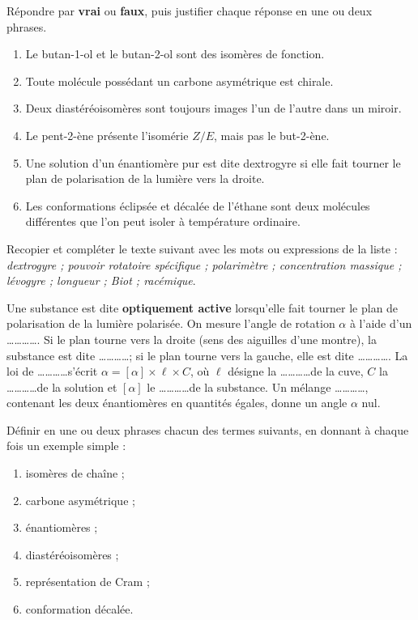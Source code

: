 \documentclass[11pt]{article}
\begin{document}
\begin{exercice}
Répondre par \textbf{vrai} ou \textbf{faux}, puis justifier chaque réponse en une ou deux phrases.
\begin{enumerate}
\item Le butan-1-ol et le butan-2-ol sont des isomères de fonction.
\item Toute molécule possédant un carbone asymétrique est chirale.
\item Deux diastéréoisomères sont toujours images l'un de l'autre dans un miroir.
\item Le pent-2-ène présente l'isomérie $Z/E$, mais pas le but-2-ène.
\item Une solution d'un énantiomère pur est dite dextrogyre si elle fait tourner le plan de polarisation de la lumière vers la droite.
\item Les conformations éclipsée et décalée de l'éthane sont deux molécules différentes que l'on peut isoler à température ordinaire.
\end{enumerate}
\end{exercice}

\begin{exercice}
Recopier et compléter le texte suivant avec les mots ou expressions de la liste : \emph{dextrogyre ; pouvoir rotatoire spécifique ; polarimètre ; concentration massique ; lévogyre ; longueur ; Biot ; racémique}.

\medskip
Une substance est dite \textbf{optiquement active} lorsqu'elle fait tourner le plan de polarisation de la lumière polarisée. On mesure l'angle de rotation $\alpha$ à l'aide d'un \ldots\ldots\ldots\ldots . Si le plan tourne vers la droite (sens des aiguilles d'une montre), la substance est dite \ldots\ldots\ldots\ldots ; si le plan tourne vers la gauche, elle est dite \ldots\ldots\ldots\ldots . La loi de \ldots\ldots\ldots\ldots s'écrit $\alpha = [\alpha] \times \ell \times C$, où $\ell$ désigne la \ldots\ldots\ldots\ldots de la cuve, $C$ la \ldots\ldots\ldots\ldots de la solution et $[\alpha]$ le \ldots\ldots\ldots\ldots de la substance. Un mélange \ldots\ldots\ldots\ldots , contenant les deux énantiomères en quantités égales, donne un angle $\alpha$ nul.
\end{exercice}

\begin{exercice}
Définir en une ou deux phrases chacun des termes suivants, en donnant à chaque fois un exemple simple :
\begin{enumerate}
\item isomères de chaîne ;
\item carbone asymétrique ;
\item énantiomères ;
\item diastéréoisomères ;
\item représentation de Cram ;
\item conformation décalée.
\end{enumerate}
\end{exercice}
\end{document}
